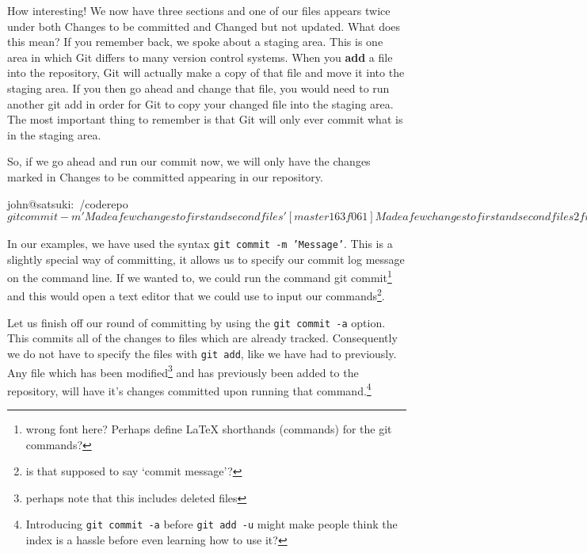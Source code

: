 
How interesting! We now have three sections and one of our files appears twice under both Changes to be committed and Changed but not updated.
What does this mean? If you remember back, we spoke about a staging area.
This is one area in which Git differs to many version control systems.
When you \textbf{add} a file into the repository, Git will actually make a copy of that file and move it into the staging area.
If you then go ahead and change that file, you would need to run another git add in order for Git to copy your changed file into the staging area.
The most important thing to remember is that Git will only ever commit what is in the staging area.

So, if we go ahead and run our commit now, we will only have the changes marked in Changes to be committed appearing in our repository.

\begin{code}
john@satsuki:~/coderepo$ git commit -m 'Made a few changes to first and second files'
[master 163f061] Made a few changes to first and second files
 2 files changed, 2 insertions(+), 0 deletions(-)
 create mode 100644 my_second_committed_file
john@satsuki:~/coderepo$
\end{code}

In our examples, we have used the syntax \texttt{git commit -m 'Message'}.
This is a slightly special way of committing, it allows us to specify our commit log message on the command line.
If we wanted to, we could run the command git commit\footnote{wrong font here? Perhaps define \LaTeX{} shorthands (commands) for the git commands?} and this would open a text editor that we could use to input our commands\footnote{is that supposed to say `commit message'?}.

Let us finish off our round of committing by using the \texttt{git commit -a} option.
This commits all of the changes to files which are already tracked.
Consequently we do not have to specify the files with \texttt{git add}, like we have had to previously.
Any file which has been modified\footnote{perhaps note that this includes deleted files} and has previously been added to the repository, will have it's changes committed upon running that command.\footnote{Introducing \texttt{git commit -a} before \texttt{git add -u} might make people think the index is a hassle before even learning how to use it?}

